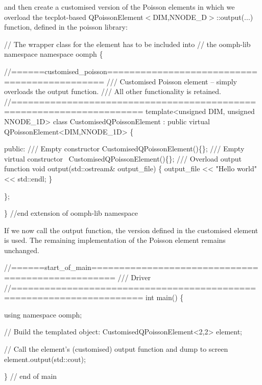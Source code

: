 and then create a customised version of the Poisson elements in which we overload the tecplot-\/based {\ttfamily Q\+Poisson\+Element$<$\+D\+I\+M,\+N\+N\+O\+D\+E\+\_\+D$>$\+::output}(...) function, defined in the {\ttfamily poisson} library\+:

 
\begin{DoxyCodeInclude}
\textcolor{comment}{// The wrapper class for the element has to be included into }
\textcolor{comment}{// the oomph-lib namespace}
\textcolor{keyword}{namespace }oomph
\{

\textcolor{comment}{//======customised\_poisson=============================================}\textcolor{comment}{}
\textcolor{comment}{/// Customised Poisson element -- simply overloads the output function.}
\textcolor{comment}{/// All other functionality is retained.}
\textcolor{comment}{}\textcolor{comment}{//=====================================================================}
\textcolor{keyword}{template}<\textcolor{keywordtype}{unsigned} DIM, \textcolor{keywordtype}{unsigned} NNODE\_1D>
\textcolor{keyword}{class }CustomisedQPoissonElement : \textcolor{keyword}{public} \textcolor{keyword}{virtual} QPoissonElement<DIM,NNODE\_1D>
\{

\textcolor{keyword}{public}:
\textcolor{comment}{}
\textcolor{comment}{ /// Empty constructor}
\textcolor{comment}{} CustomisedQPoissonElement()\{\};
\textcolor{comment}{}
\textcolor{comment}{ /// Empty virtual constructor}
\textcolor{comment}{} ~CustomisedQPoissonElement()\{\};
\textcolor{comment}{}
\textcolor{comment}{ /// Overload output function}
\textcolor{comment}{} \textcolor{keywordtype}{void} output(std::ostream& output\_file)
  \{
   output\_file << \textcolor{stringliteral}{"Hello world"} << std::endl;
  \}

\};

\} \textcolor{comment}{//end extension of oomph-lib namespace}

\end{DoxyCodeInclude}


If we now call the output function, the version defined in the customised element is used. The remaining implementation of the Poisson element remains unchanged.


\begin{DoxyCodeInclude}



\textcolor{comment}{//======start\_of\_main==================================================}\textcolor{comment}{}
\textcolor{comment}{/// Driver}
\textcolor{comment}{}\textcolor{comment}{//=====================================================================}
\textcolor{keywordtype}{int} main()
\{

 \textcolor{keyword}{using namespace }oomph;

 \textcolor{comment}{// Build the templated object:}
 CustomisedQPoissonElement<2,2> element;

 \textcolor{comment}{// Call the element's (customised) output function and dump to screen}
 element.output(std::cout);

\} \textcolor{comment}{// end of main}

\end{DoxyCodeInclude}


